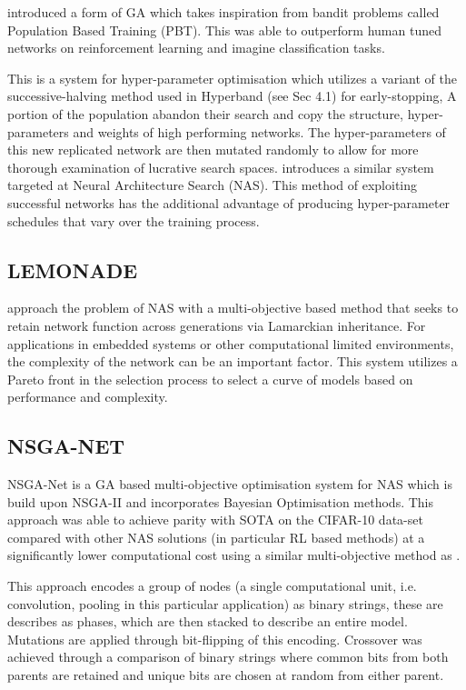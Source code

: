 \documentclass{article}
\begin{document}
		\cite{39} introduced a form of GA which takes inspiration from bandit problems called Population Based Training (PBT). This was able to outperform human tuned networks on reinforcement learning and imagine classification tasks.
		\par
		This is a system for hyper-parameter optimisation which utilizes a variant of the  successive-halving\cite{SH} method used in Hyperband (see Sec 4.1) for early-stopping, A portion of the population abandon their search and copy the structure, hyper-parameters and weights of high performing networks. The hyper-parameters of this new replicated network are then mutated randomly to allow for more thorough examination of lucrative search spaces. \cite{13} introduces a similar system targeted at Neural Architecture Search (NAS).
		This method of exploiting successful networks has the additional advantage of producing hyper-parameter schedules that vary over the training process.


	\subsection{LEMONADE}

		\cite{13} approach the problem of NAS with a multi-objective based method that seeks to retain network function across generations via Lamarckian inheritance.
		 For applications in embedded systems or other computational limited environments, the complexity of the network can be an important factor. This system utilizes a Pareto front in the selection process to select a curve of models based on performance and complexity. 
	 

	\subsection{NSGA-NET}

		NSGA-Net \cite{5} is a GA based multi-objective optimisation system for NAS which is build upon NSGA-II\cite{42} and incorporates Bayesian Optimisation methods. This approach was able to achieve parity with SOTA on the CIFAR-10 data-set compared with other NAS solutions (in particular RL based methods) at a significantly lower computational cost using a similar multi-objective method as \cite{13}.

		This approach encodes a group of nodes (a single computational unit, i.e. convolution, pooling in this particular application) as binary strings, these are describes as phases, which are then stacked to describe an entire model. Mutations are applied through bit-flipping of this encoding. Crossover was achieved through a comparison of binary strings where common bits from both parents are retained and unique bits are chosen at random from either parent.
\end{document}
